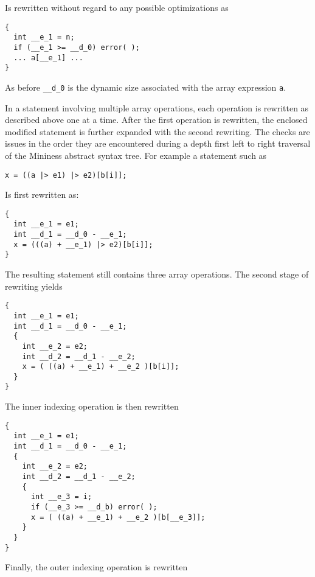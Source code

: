 Is rewritten without regard to any possible optimizations as

\singlespace
\begin{lstlisting}[language=nesC]
{
  int __e_1 = n;
  if (__e_1 >= __d_0) error( );
  ... a[__e_1] ...
}
\end{lstlisting}
\primaryspacing

As before \texttt{\_\_d\_0} is the dynamic size associated with the array expression \texttt{a}.

In a statement involving multiple array operations, each operation is rewritten as described
above one at a time. After the first operation is rewritten, the enclosed modified statement is
further expanded with the second rewriting. The checks are issues in the order they are
encountered during a depth first left to right traversal of the Mininess abstract syntax tree.
For example a statement such as

\singlespace
\begin{lstlisting}[language=nesC]
x = ((a |> e1) |> e2)[b[i]];
\end{lstlisting}
\primaryspacing

Is first rewritten as:

\singlespace
\begin{lstlisting}[language=nesC]
{
  int __e_1 = e1;
  int __d_1 = __d_0 - __e_1;
  x = (((a) + __e_1) |> e2)[b[i]];
}
\end{lstlisting}
\primaryspacing

The resulting statement still contains three array operations. The second stage of rewriting
yields

\singlespace
\begin{lstlisting}[language=nesC]
{
  int __e_1 = e1;
  int __d_1 = __d_0 - __e_1;
  {
    int __e_2 = e2;
    int __d_2 = __d_1 - __e_2;
    x = ( ((a) + __e_1) + __e_2 )[b[i]];
  }
}
\end{lstlisting}
\primaryspacing

The inner indexing operation is then rewritten

\singlespace
\begin{lstlisting}[language=nesC]
{
  int __e_1 = e1;
  int __d_1 = __d_0 - __e_1;
  {
    int __e_2 = e2;
    int __d_2 = __d_1 - __e_2;
    {
      int __e_3 = i;
      if (__e_3 >= __d_b) error( );
      x = ( ((a) + __e_1) + __e_2 )[b[__e_3]];
    }
  }
}
\end{lstlisting}
\primaryspacing

Finally, the outer indexing operation is rewritten

